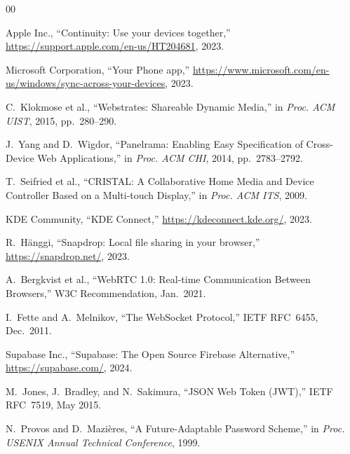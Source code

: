 \documentclass[conference]{IEEEtran}
\begin{document}
\begin{thebibliography}{00}

Apple Inc., ``Continuity: Use your devices together,'' \url{https://support.apple.com/en-us/HT204681}, 2023.

Microsoft Corporation, ``Your Phone app,'' \url{https://www.microsoft.com/en-us/windows/sync-across-your-devices}, 2023.

C.~Klokmose et al., ``Webstrates: Shareable Dynamic Media,'' in \textit{Proc. ACM UIST}, 2015, pp.~280--290.

J.~Yang and D.~Wigdor, ``Panelrama: Enabling Easy Specification of Cross-Device Web Applications,'' in \textit{Proc. ACM CHI}, 2014, pp.~2783--2792.

T.~Seifried et al., ``CRISTAL: A Collaborative Home Media and Device Controller Based on a Multi-touch Display,'' in \textit{Proc. ACM ITS}, 2009.

KDE Community, ``KDE Connect,'' \url{https://kdeconnect.kde.org/}, 2023.

R.~H\"{a}nggi, ``Snapdrop: Local file sharing in your browser,'' \url{https://snapdrop.net/}, 2023.

A.~Bergkvist et al., ``WebRTC 1.0: Real-time Communication Between Browsers,'' W3C Recommendation, Jan.\ 2021.

I.~Fette and A.~Melnikov, ``The WebSocket Protocol,'' IETF RFC~6455, Dec.\ 2011.

Supabase Inc., ``Supabase: The Open Source Firebase Alternative,'' \url{https://supabase.com/}, 2024.

M.~Jones, J.~Bradley, and N.~Sakimura, ``JSON Web Token (JWT),'' IETF RFC~7519, May 2015.

N.~Provos and D.~Mazi\`{e}res, ``A Future-Adaptable Password Scheme,'' in \textit{Proc. USENIX Annual Technical Conference}, 1999.

\end{thebibliography}
\end{document}
